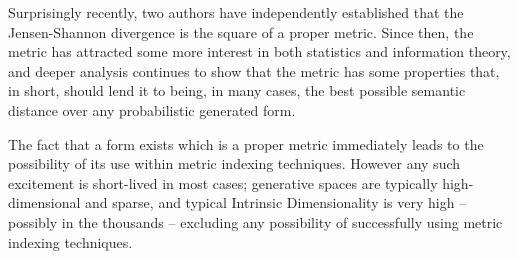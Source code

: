 
Surprisingly recently, two authors \cite{endres:2003,OstVaj03} have independently established that the Jensen-Shannon divergence is the square of a proper metric. Since then, the metric has attracted some more interest in both statistics and information theory, and deeper analysis \cite{fuglede:paper} continues to show that the metric has some properties that, in short, should lend it to being, in many cases, the best possible semantic distance over any probabilistic generated form.
 
The fact that a form exists which is a proper metric immediately leads to the possibility of its use within metric indexing techniques. However any such excitement is short-lived in most cases; generative spaces are typically high-dimensional and sparse, and typical Intrinsic Dimensionality is very high -- possibly in the thousands -- excluding any possibility of successfully using metric indexing techniques.


%
%
%

